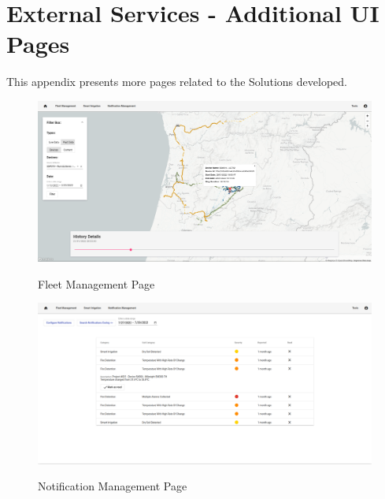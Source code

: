 \chapter{External Services - Additional UI Pages}
\label{AppendixD2}

This appendix presents more pages related to the Solutions developed.

\begin{figure}[H]
   \centering
   \resizebox{\columnwidth}{!}
   {
      \includegraphics{assets/figures/ui/fleet.png}
   }
   \caption[Fleet Management Page]{Fleet Management Page}
   \label{fig:AppendixD2:fleet}
\end{figure}

\begin{figure}[H]
   \centering
   \resizebox{\columnwidth}{!}
   {
      \includegraphics{assets/figures/ui/notification.png}
   }
   \caption[Notification Management Page]{Notification Management Page}
   \label{fig:AppendixD2:notification}
\end{figure}

